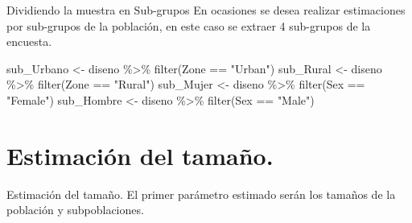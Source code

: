 \documentclass[
  ignorenonframetext,
]{beamer}
\newenvironment{Shaded}{\begin{snugshade}}{\end{snugshade}}
\newcommand{\FunctionTok}[1]{\textcolor[rgb]{0.00,0.00,0.00}{#1}}
\newcommand{\NormalTok}[1]{#1}
\newcommand{\OtherTok}[1]{\textcolor[rgb]{0.56,0.35,0.01}{#1}}
\newcommand{\SpecialCharTok}[1]{\textcolor[rgb]{0.00,0.00,0.00}{#1}}
\newcommand{\StringTok}[1]{\textcolor[rgb]{0.31,0.60,0.02}{#1}}
\begin{document}
\begin{frame}[fragile]{Dividiendo la muestra en Sub-grupos}
\protect\hypertarget{dividiendo-la-muestra-en-sub-grupos}{}
En ocasiones se desea realizar estimaciones por sub-grupos de la
población, en este caso se extraer 4 sub-grupos de la encuesta.

\begin{Shaded}
\begin{Highlighting}[]
\NormalTok{sub\_Urbano }\OtherTok{\textless{}{-}}\NormalTok{ diseno }\SpecialCharTok{\%\textgreater{}\%}  \FunctionTok{filter}\NormalTok{(Zone }\SpecialCharTok{==} \StringTok{"Urban"}\NormalTok{)}
\NormalTok{sub\_Rural  }\OtherTok{\textless{}{-}}\NormalTok{ diseno }\SpecialCharTok{\%\textgreater{}\%}  \FunctionTok{filter}\NormalTok{(Zone }\SpecialCharTok{==} \StringTok{"Rural"}\NormalTok{)}
\NormalTok{sub\_Mujer  }\OtherTok{\textless{}{-}}\NormalTok{ diseno }\SpecialCharTok{\%\textgreater{}\%}  \FunctionTok{filter}\NormalTok{(Sex }\SpecialCharTok{==} \StringTok{"Female"}\NormalTok{)}
\NormalTok{sub\_Hombre }\OtherTok{\textless{}{-}}\NormalTok{ diseno }\SpecialCharTok{\%\textgreater{}\%}  \FunctionTok{filter}\NormalTok{(Sex }\SpecialCharTok{==} \StringTok{"Male"}\NormalTok{)}
\end{Highlighting}
\end{Shaded}
\end{frame}

\hypertarget{estimaciuxf3n-del-tamauxf1o.}{%
\section{Estimación del tamaño.}\label{estimaciuxf3n-del-tamauxf1o.}}

\begin{frame}{Estimación del tamaño.}
El primer parámetro estimado serán los tamaños de la población y
subpoblaciones.
\end{frame}
\end{document}
